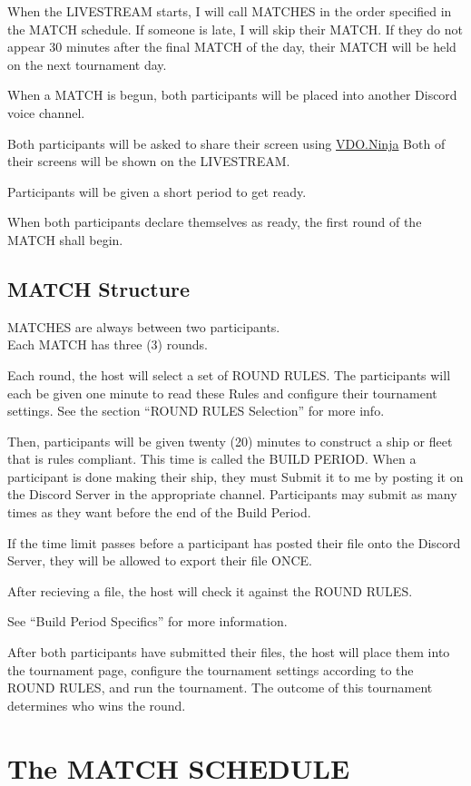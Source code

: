 \documentclass[11pt]{article}
\newcommand{\termemph}[1]{\uppercase{#1}}
\begin{document}
When the \termemph{Livestream} starts, I will call \termemph{matches} in the order specified in the \termemph{match} schedule.
If someone is late, I will skip their \termemph{match}. If they do not appear
30 minutes after the final \termemph{match} of the day, their \termemph{match} will be held on the next tournament day.

When a \termemph{match} is begun, both participants will be placed into another Discord voice channel.

Both participants will be asked to share their screen using \href{https://vdo.ninja/}{VDO.Ninja}
Both of their screens will be shown on the \termemph{Livestream}.

Participants will be given a short period to get ready. 

When both participants declare themselves as ready, the first round of the \termemph{match} shall begin.

\subsection{\termemph{match} Structure}
\termemph{matches} are always between two participants.\\
Each \termemph{match} has three (3) rounds.

Each round, the host will select a set of \termemph{Round Rules}. The participants will each be given 
one minute to read these Rules and configure their tournament settings. See the section 
``\termemph{Round Rules} Selection'' for more info.

Then, participants will be given twenty (20) minutes to construct a ship or fleet that is rules
compliant.
This time is called the \termemph{Build Period}.
When a participant is done making their ship, they must Submit it to me by posting it on the 
Discord Server in the appropriate channel. Participants may submit as many times as they want
before the end of the Build Period.

If the time limit passes before a participant has posted their file onto the Discord Server, they 
will be allowed to export their file ONCE.

After recieving a file, the host will check it against the \termemph{Round Rules}.

See ``Build Period Specifics'' for more information.

After both participants have submitted their files, the host will place them into the tournament 
page, configure the tournament settings according to the \termemph{Round Rules}, and run the tournament. The 
outcome of this tournament determines who wins the round.

\section{The \termemph{Match Schedule}}
\end{document}
